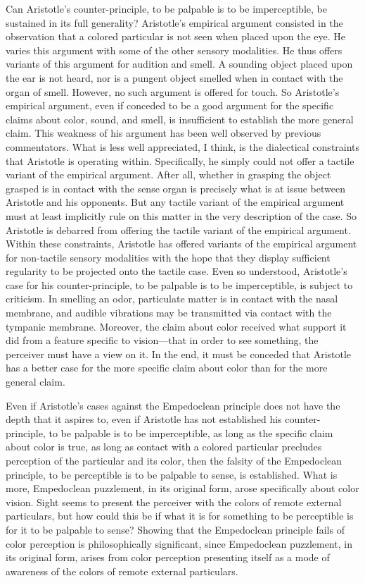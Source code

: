 Can Aristotle's counter-principle, to be palpable is to be imperceptible, be sustained in its full generality? Aristotle's empirical argument consisted in the observation that a colored particular is not seen when placed upon the eye. He varies this argument with some of the other sensory modalities. He thus offers variants of this argument for audition and smell. A sounding object placed upon the ear is not heard, nor is a pungent object smelled when in contact with the organ of smell. However, no such argument is offered for touch. So Aristotle's empirical argument, even if conceded to be a good argument for the specific claims about color, sound, and smell, is insufficient to establish the more general claim. This weakness of his argument has been well observed by previous commentators. What is less well appreciated, I think, is the dialectical constraints that Aristotle is operating within. Specifically, he simply could not offer a tactile variant of the empirical argument. After all, whether in grasping the object grasped is in contact with the sense organ is precisely what is at issue between Aristotle and his opponents. But any tactile variant of the empirical  argument must at least implicitly rule on this matter in the very description of the case. So Aristotle is debarred from offering the tactile variant of the empirical argument. Within these constraints, Aristotle has offered variants of the empirical argument for non-tactile sensory modalities with the hope that they display sufficient regularity to be projected onto the tactile case. Even so understood, Aristotle's case for his counter-principle, to be palpable is to be imperceptible, is subject to criticism. In smelling an odor, particulate matter is in contact with the nasal membrane, and audible vibrations may be transmitted via contact with the tympanic membrane. Moreover, the claim about color received what support it did from a feature specific to vision---that in order to see something, the perceiver must have a view on it. In the end, it must be conceded that Aristotle has a better case for the more specific claim about color than for the more general claim.

Even if Aristotle's cases against the Empedoclean principle does not have the depth that it aspires to, even if Aristotle has not established his counter-principle, to be palpable is to be imperceptible, as long as the specific claim about color is true, as long as contact with a colored particular precludes perception of the particular and its color, then the falsity of the Empedoclean principle, to be perceptible is to be palpable to sense, is established. What is more, Empedoclean puzzlement, in its original form, arose specifically about color vision. Sight seems to present the perceiver with the colors of remote external particulars, but how could this be if what it is for something to be perceptible is for it to be palpable to sense? Showing that the Empedoclean principle fails of color perception is philosophically significant, since Empedoclean puzzlement, in its original form, arises from color perception presenting itself as a mode of awareness of the colors of remote external particulars. 

